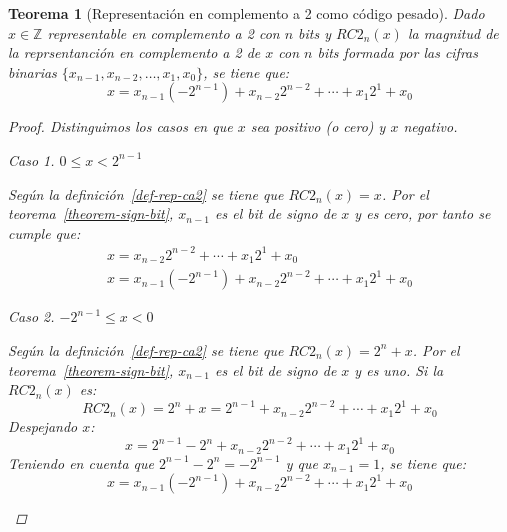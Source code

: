 \documentclass[spanish,a4paper,12pt,titlepage]{article}
\newtheorem{theorem}{Teorema}%
\theoremstyle{definition}
\theoremstyle{remark}
\newtheorem{case}{Caso}
\newcommand{\bbZ}{\mathbb{Z}}
\begin{document}
\begin{theorem}[Representación en complemento a 2 como código pesado]
    Dado $x \in \bbZ$ representable en complemento a 2 con $n$ bits y $RC2_n(x)$ la magnitud de la reprsentanción en complemento a 2 de $x$ con $n$ bits formada por las cifras binarias $\{x_{n-1}, x_{n-2}, \ldots, x_1, x_0\}$, se tiene que:
    \[
        x = x_{n-1} (-2^{n-1})+x_{n-2} 2^{n-2}+ \cdots + x_1 2^1+x_0
    \]
    \begin{proof}
        Distinguimos los casos en que $x$ sea positivo (o cero) y $x$ negativo.

        \begin{case}
            $0 \le x < 2^{n-1}$

            Según la definición~\ref{def-rep-ca2} se tiene que $RC2_n(x) = x$. Por el teorema~\ref{theorem-sign-bit}, $x_{n-1}$ es el bit de signo de $x$ y es cero, por tanto se cumple que:
            \begin{align*}
                x = x_{n-2} 2^{n-2}+ \cdots + x_1 2^1+x_0\\
                x = x_{n-1} (-2^{n-1})+x_{n-2} 2^{n-2}+ \cdots + x_1 2^1+x_0
            \end{align*}
        \end{case}
        \begin{case}
            $-2^{n-1} \le x < 0$

            Según la definición~\ref{def-rep-ca2} se tiene que $RC2_n(x) = 2^n + x$. Por el teorema~\ref{theorem-sign-bit}, $x_{n-1}$ es el bit de signo de $x$ y es uno. Si la $RC2_n(x)$ es:
            \[
                RC2_n(x) = 2^n + x = 2^{n-1}+x_{n-2}2^{n-2}+\cdots+x_1 2^1+x_0
            \]
            Despejando $x$:
            \[
                x = 2^{n-1}-2^n + x_{n-2} 2^{n-2}+ \cdots +x_1 2^1+x_0
            \]
            Teniendo en cuenta que $2^{n-1}-2^n = -2^{n-1}$ y que $x_{n-1}=1$, se tiene que:
            \[
                x = x_{n-1} (-2^{n-1})+x_{n-2} 2^{n-2}+ \cdots + x_1 2^1+x_0
            \]
        \end{case}
    \end{proof}
\end{theorem}
\end{document}
